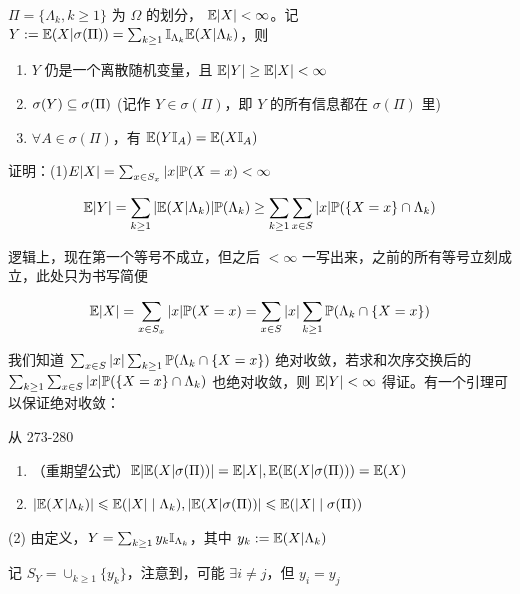 \begin{theorem}\label{thm:partition_con_exp}
    $\Pi=\{\Lambda_k,k\geq 1\}$ 为 $\Omega$ 的划分， $\mathbb E|X|<\infty$。记 $Y:=\mathbb E(X|\sigma(\Pi))=\sum_{k\geq 1}\mathbb I_{\Lambda_k}\mathbb E(X|\Lambda_k)$，则
    \begin{enumerate}
        \item $Y$ 仍是一个离散随机变量，且 $\mathbb E|Y|\geq \mathbb E|X|<\infty$
        \item $\sigma(Y)\subseteq \sigma(\Pi)$ (记作 $Y\in \sigma(\Pi)$，即 $Y$ 的所有信息都在 $\sigma(\Pi)$ 里)
        \item $\forall A\in \sigma(\Pi)$，有 $\mathbb E(Y\mathbb I_A)=\mathbb E(X\mathbb I_A)$
    \end{enumerate}
\end{theorem}

证明：(1)$E|X|=\sum_{x\in S_x}|x|\mathbb{P}(X=x)<\infty$

\[
    \mathbb E|Y|=\sum_{k\geq 1}|\mathbb E(X|\Lambda_k)|\mathbb{P}(\Lambda_k)\geq \sum_{k\geq 1}\sum_{x\in S}|x|\mathbb{P}(\{X=x\}\cap \Lambda_k)
\]

逻辑上，现在第一个等号不成立，但之后 $<\infty$ 一写出来，之前的所有等号立刻成立，此处只为书写简便

\[
    \mathbb E|X|=\sum_{x\in S_x}|x|\mathbb{P}(X=x)=\sum_{x\in S}|x|\sum_{k\geq 1}\mathbb{P}(\Lambda_k\cap \{X=x\})
\]

我们知道 $\sum_{x\in S}|x|\sum_{k\geq 1}\mathbb{P}(\Lambda_k\cap \{X=x\})$ 绝对收敛，若求和次序交换后的 $\sum_{k\geq 1}\sum_{x\in S}|x|\mathbb{P}(\{X=x\}\cap \Lambda_k)$ 也绝对收敛，则 $\mathbb E|Y|<\infty$ 得证。有一个引理可以保证绝对收敛：

\begin{lemma}
    从 273-280
\end{lemma}

\begin{corollary}\label{cor:double_exp}
    \begin{enumerate}
        \item （重期望公式）$\mathbb E|\mathbb E(X|\sigma(\Pi))|=\mathbb E|X|, \mathbb E(\mathbb E(X|\sigma(\Pi)))=\mathbb E(X)$
        \item $|\mathbb E(X|\Lambda_k)|\leqslant \mathbb E(|X|\mid\Lambda_k), |\mathbb E(X|\sigma(\Pi))|\leqslant \mathbb E(|X|\mid\sigma(\Pi))$
    \end{enumerate}
\end{corollary}

(2) 由定义，$Y=\sum_{k\geq 1}y_k\mathbb I_{\Lambda_k}$，其中 $y_k:=\mathbb E(X|\Lambda_k)$

记 $S_Y=\cup_{k\geq 1}\{y_k\}$，注意到，可能 $\exists i\neq j$，但 $y_i=y_j$

